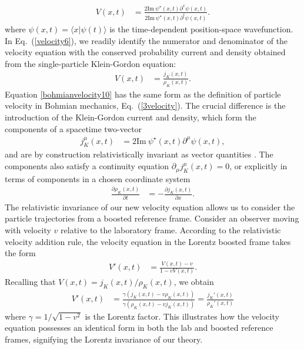 \documentclass[12pt,prx,
,nofootinbib
,floatfix
,superscriptaddress
]{revtex4-2}
\newcommand{\p}{\partial}
\begin{document}
\begin{align}\label{velocity6}
    V(x,t) &= \frac{2 \text{Im} \: \psi^\star(x,t) \p^x \psi(x,t)}{2 \text{Im} \: \psi^\star(x,t) \p^t  \psi(x,t)}.
\end{align}
where $\psi(x,t) = \langle x |\psi(t)\rangle$ is the time-dependent position-space wavefunction. In Eq.\ (\ref{velocity6}), we readily identify the numerator and denominator of the velocity equation with the conserved probability current and density obtained from the single-particle Klein-Gordon equation:
\begin{align}\label{bohmianvelocity10}
    V(x,t) &= \frac{j_{K}(x,t)}{\rho_{K} (x,t)}. 
\end{align}
Equation \ref{bohmianvelocity10} has the same form as the definition of particle velocity in Bohmian mechanics, Eq.\ (\ref{3velocity}). The crucial difference is the introduction of the Klein-Gordon current and density, which form the components of a spacetime two-vector
\begin{align}
    j_{K}^\mu (x,t) &= 2 \text{Im} \:  \psi^\star(x,t) \p^\mu \psi(x,t) ,
\end{align}
and are by construction relativistically invariant as vector quantities \cite{landau2013classical}. The components also satisfy a continuity equation $\p_\mu j_{K}^\mu(x,t) = 0$, or explicitly in terms of components in a chosen coordinate system 
\begin{align}
    \frac{\p \rho_{K}(x,t)}{\p t} &= - \frac{\p j_{K}(x,t)}{\p x}.
\end{align}
The relativistic invariance of our new velocity equation allows us to consider the particle trajectories from a boosted reference frame. Consider an observer moving with velocity $v$ relative to the laboratory frame. According to the relativistic velocity addition rule, the velocity equation in the Lorentz boosted frame takes the form
\begin{align}
    V'(x,t) &= \frac{V(x,t) - v}{1 - v V(x,t)} .
\end{align}
Recalling that $V(x,t) = j_K(x,t) /\rho_K(x,t)$, we obtain
\begin{align}
    V'(x,t) &= \frac{\gamma( j_K(x,t) - v \rho_K(x,t))}{\gamma(\rho_K(x,t) - vj_K(x,t) ) } = \frac{j_K'(x,t)}{\rho_K'(x,t)}
\end{align}
where $\gamma = 1/\sqrt{1-v^2}$ is the Lorentz factor. This illustrates how the velocity equation possesses an identical form in both the lab and boosted reference frames, signifying the Lorentz invariance of our theory. 
\end{document}
